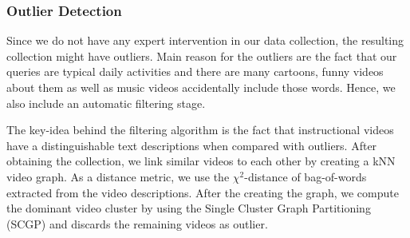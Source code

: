 \subsubsection{Outlier Detection}
\label{filter}
Since we do not have any expert intervention in our data collection, the resulting collection might have outliers. Main reason for the outliers are  the fact that our queries are typical daily activities and there are many cartoons, funny videos about them as well as music videos accidentally include those words. Hence, we also include an automatic filtering stage.


The key-idea behind the filtering algorithm is the fact that instructional videos have a distinguishable text descriptions when compared with outliers. After obtaining the collection, we link similar videos to each other by creating a kNN video graph. As a distance metric, we use the $\chi^2$-distance of bag-of-words extracted from the video descriptions. After the creating the graph, we compute the dominant video cluster by using the Single Cluster Graph Partitioning (SCGP)\cite{scgp} and discards the remaining videos as outlier.

